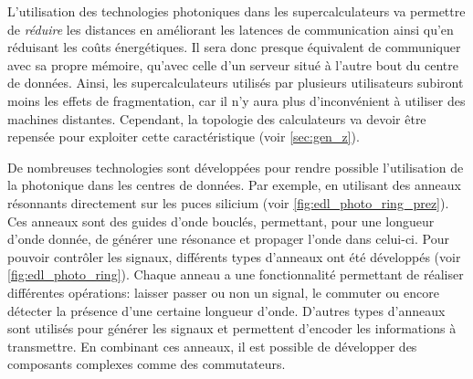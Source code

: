     
        L'utilisation des technologies photoniques dans les supercalculateurs va permettre de \textit{réduire} les distances en améliorant les latences de communication ainsi qu'en réduisant les coûts énergétiques. Il sera donc presque équivalent de communiquer avec sa propre mémoire, qu'avec celle d'un serveur situé à l'autre bout du centre de données. Ainsi, les supercalculateurs utilisés par plusieurs utilisateurs subiront moins les effets de fragmentation, car il n'y aura plus d'inconvénient à utiliser des machines distantes. Cependant, la topologie des calculateurs va devoir être repensée pour exploiter cette caractéristique (voir \autoref{sec:gen_z}).
        
        
        De nombreuses technologies sont développées pour rendre possible l'utilisation de la photonique dans les centres de données. Par exemple, en utilisant des anneaux résonnants directement sur les puces silicium (voir \autoref{fig:edl_photo_ring_prez}). Ces anneaux sont des guides d’onde bouclés, permettant, pour une longueur d'onde donnée, de générer une résonance et propager l'onde dans celui-ci. Pour pouvoir contrôler les signaux, différents types d'anneaux ont été développés (voir \autoref{fig:edl_photo_ring}). Chaque anneau a une fonctionnalité permettant de réaliser différentes opérations: laisser passer ou non un signal, le commuter ou encore détecter la présence d'une certaine longueur d'onde. D'autres types d'anneaux sont utilisés pour générer les signaux et permettent d'encoder les informations à transmettre. En combinant ces anneaux, il est possible de développer des composants complexes comme des commutateurs.
        
